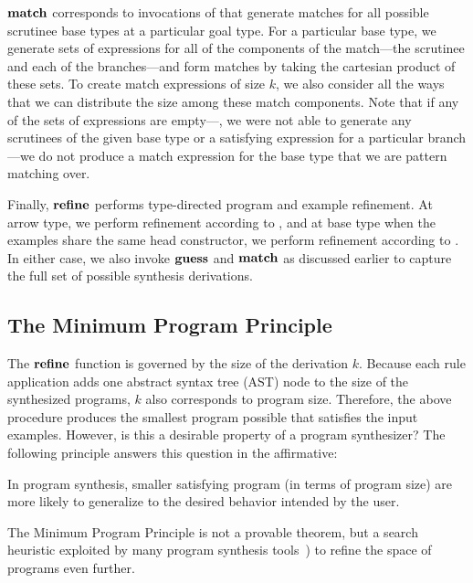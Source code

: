 $\mathbf{match}$ corresponds to invocations of  that generate matches for all possible scrutinee base types at a particular goal type.
For a particular base type, we generate sets of expressions for all of the components of the match---the scrutinee and each of the branches---and form matches by taking the cartesian product of these sets.
To create match expressions of size $k$, we also consider all the ways that we can distribute the size among these match components.
Note that if any of the sets of expressions are empty---\ie, we were not able to generate any scrutinees of the given base type or a satisfying expression for a particular branch---we do not produce a match expression for the base type that we are pattern matching over.

Finally, $\mathbf{refine}$ performs type-directed program and example refinement.
At arrow type, we perform refinement according to , and at base type when the examples share the same head constructor, we perform refinement according to .
In either case, we also invoke $\mathbf{guess}$ and $\mathbf{match}$ as discussed earlier to capture the full set of possible synthesis derivations.

\subsection{The Minimum Program Principle}
\label{subsec:the-minimum-program-principle}

The $\mathbf{refine}$ function is governed by the size of the derivation $k$.
Because each rule application adds one abstract syntax tree (AST) node to the size of the synthesized programs, $k$ also corresponds to program size.
Therefore, the above procedure produces the smallest program possible that satisfies the input examples.
However, is this a desirable property of a program synthesizer?
The following principle answers this question in the affirmative:
\begin{definition}
  In program synthesis, smaller satisfying program (in terms of program size) are more likely to generalize to the desired behavior intended by the user.
\end{definition}
The Minimum Program Principle is not a provable theorem, but a search heuristic exploited by many program synthesis tools~\citep{summers-popl-1976, albarghouthi-cav-2013, perelman-pldi-2014, feser-pldi-2015}) to refine the space of programs even further.

